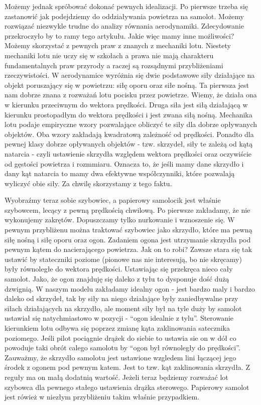 \documentclass[10pt,twocolumn]{article}
\begin{document}
Możemy jednak spróbować dokonać pewnych idealizacji. Po pierwsze
trzeba się zastanowić jak podejdziemy do oddziaływania powietrza na
samolot. Możemy rozwiązać niezwykle trudne do analizy równania
aerodynamiki. Zdecydowanie przekroczyło by to ramy tego
artykułu. Jakie więc mamy inne możliwości? Możemy skorzystać z pewnych
praw z znanych z mechaniki lotu. Niestety mechaniki lotu nie uczy się
w szkołach a prawa nie mają charakteru fundamentalnych praw przyrody a
raczej są rozsądnymi przybliżeniami rzeczywistości. W aerodynamice
wyróżnia się dwie podstawowe siły działające na objekt poruszający się
w powietrzu: siłę oporu oraz siłe nośną. Ta pierwsza jest nam dobrze
znana z rozważań lotu pocisku przez powietrze. Wiemy, że działa ona w
kierunku przeciwnym do wektora prędkości. Druga siła jest siłą
działającą w kierunku prostopadłym do wektora prędkości i jest zwana
siłą nośną. Mechanika lotu podaje empiryczne wzory pozwalające
obliczyć te siły dla dobrze opływanych objektów. Oba wzory zakładają
kwadratową zależność od prędkości. Ponadto dla pewnej klasy dobrze
opływanych objektów - tzw. skrzydeł, siły te zależą od kątą natarcia -
czyli ustawienie skrzydła względem wektora prędkości oraz oczywiście
od gęstości powietrza i rozmmiaru. Oznacza to, że jeśli mamy dane
skrzydło i dany kąt natarcia to mamy dwa efektywne współczynniki,
które pozwalają wyliczyć obie siły. Za chwilę skorzystamy z tego faktu.

Wyobraźmy teraz sobie szybowiec, a papierowy samolocik jest właśnie
szybowcem, lecący z pewną prędkością chwilową. Po pierwsze zakładamy,
że nie wykonujemy zakrętów. Dopuszczamy tylko nurkowanie i wznoszenie
się. W pewnym przybliżenu można traktować szybowiec jako skrzydło,
które ma pewną siłę nośną i siłę oporu oraz ogon. Zadaniem ogona jest
utrzymanie skrzydła pod pewnym kątem do nacierającego powietrza. Jak
on to robi? Zawsze stara się tak ustawić by stateczniki poziome
(pionowe nas nie interesują, bo nie skręcamy) były równoległe do
wektora prędkości. Ustawiając się przekręca nieco cały samolot. Jako,
że ogon znajduję się daleko z tyłu to dysponuje dość dużą dzwignią. W
naszym modelu zakładamy idealny ogon - jest bardzo maly i bardzo
daleko od skrzydeł, tak by siły na niego działające były zaniedbywalne
przy siłach działających na skrzydło, ale moment siły był na tyle duży
by samolot ustawiał się natychmiastowo w pozycji - ``ogon idealnie z
tylu''. Sterowanie kierunkiem lotu odbywa się poprzez zmianę kąta
zaklinowania satecznika poziomego. Jeśli pilot pociągnie drążek do
siebie to ustawia sie on w dół co powoduje taki obrót calego samolotu
by ``ogon był równoległy do prędkości''. Zauważmy, że skrzydło
samolotu jest ustawione wzgledem lini łączącej jego środek z ogonem
pod pewnym katem. Jest to tzw. kąt zaklinowania skrzydła. Z reguły ma
on małą dodatnią wartość. Jeżeli teraz będziemy rozważać lot szybowca
dla pewnego stałego ustawienia drążka sterowego. Papierowy samolot
jest rówież w niezłym przybliżeniu takim właśnie przypadkiem.
\end{document}
